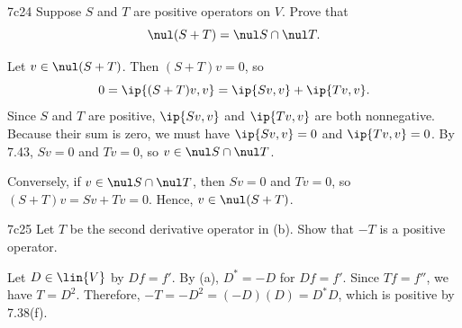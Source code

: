 \begin{exercise}{7c24}
    Suppose $S$ and $T$ are positive operators on $V$.
    Prove that
    \[
        \nul(S + T) = \nul S \cap \nul T.
    \]
\end{exercise}

\begin{sol}
    \rightset Let $v \in \nul(S + T)$.
    Then $(S + T)v = 0$, so
    \[
        0 = \ip{(S + T)v, v} = \ip{Sv, v} + \ip{Tv, v}.
    \]
    Since $S$ and $T$ are positive, $\ip{Sv, v}$ and $\ip{Tv, v}$ are both nonnegative.
    Because their sum is zero, we must have $\ip{Sv, v} = 0$ and $\ip{Tv, v} = 0$.
    By 7.43, $Sv = 0$ and $Tv = 0$, so $v \in \nul S \cap \nul T$.
    
    \leftset Conversely, if $v \in \nul S \cap \nul T$, then $Sv = 0$ and $Tv = 0$, so $(S + T)v = Sv + Tv = 0$. Hence, $v \in \nul(S + T)$.
\end{sol}

\begin{exercise}{7c25}
    Let $T$ be the second derivative operator in (b).
    Show that $-T$ is a positive operator.
\end{exercise}

\begin{sol}
    Let $D \in \lin{V}$ by $Df = f'$.
    By (a), $D^\ast = -D$ for $Df = f'$.
    Since $Tf = f''$, we have $T = D^2$.
    Therefore, $-T = -D^2 = (-D)(D) = D^\ast D$, which is positive by 7.38(f).
\end{sol}